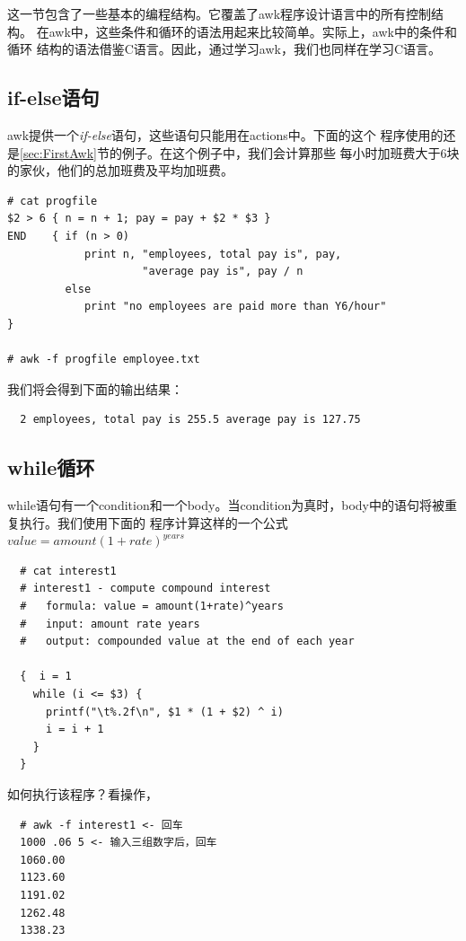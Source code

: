 这一节包含了一些基本的编程结构。它覆盖了awk程序设计语言中的所有控制结构。
在awk中，这些条件和循环的语法用起来比较简单。实际上，awk中的条件和循环
结构的语法借鉴C语言。因此，通过学习awk，我们也同样在学习C语言。

\subsection{if-else语句}

awk提供一个\textit{if-else}语句，这些语句只能用在actions中。下面的这个
程序使用的还是\ref{sec:FirstAwk}节的例子。在这个例子中，我们会计算那些
每小时加班费大于6块的家伙，他们的总加班费及平均加班费。

\begin{verbatim}
# cat progfile
$2 > 6 { n = n + 1; pay = pay + $2 * $3 }
END    { if (n > 0)
            print n, "employees, total pay is", pay,
                     "average pay is", pay / n
         else
            print "no employees are paid more than Y6/hour"
}

# awk -f progfile employee.txt
\end{verbatim}

我们将会得到下面的输出结果：

\begin{verbatim}
  2 employees, total pay is 255.5 average pay is 127.75
\end{verbatim}

\subsection{while循环}
\label{subsec:WhileLoop}

while语句有一个condition和一个body。当condition为真时，body中的语句将被重复执行。我们使用下面的
程序计算这样的一个公式$ value = amount(1+rate)^{years} $

\begin{verbatim}
  # cat interest1 
  # interest1 - compute compound interest
  #   formula: value = amount(1+rate)^years
  #   input: amount rate years
  #   output: compounded value at the end of each year
  
  {  i = 1
    while (i <= $3) {
      printf("\t%.2f\n", $1 * (1 + $2) ^ i)
      i = i + 1
    }
  }
\end{verbatim}

如何执行该程序？看操作，

\begin{verbatim}
  # awk -f interest1 <- 回车
  1000 .06 5 <- 输入三组数字后，回车
  1060.00
  1123.60
  1191.02
  1262.48
  1338.23
\end{verbatim}

